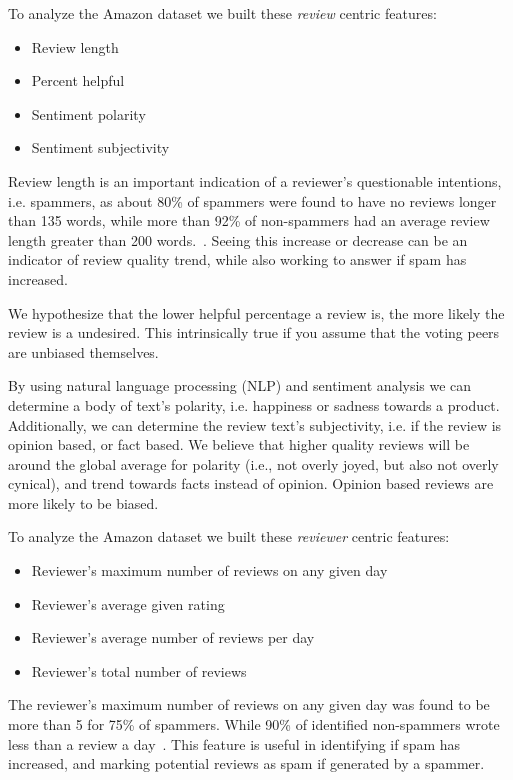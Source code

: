 \documentclass[journal, a4paper]{IEEEtran}
\begin{document}
To analyze the Amazon dataset we built these \textit{review} centric features:
\begin{itemize}
  \item Review length
  \item Percent helpful
  \item Sentiment polarity
  \item Sentiment subjectivity
\end{itemize}

Review length is an important indication of a reviewer's questionable intentions, i.e. spammers, as about 80\% of spammers were found to have no reviews longer than 135 words, while more than 92\% of non-spammers had an average review length greater than 200 words.~\cite{1}.
Seeing this increase or decrease can be an indicator of review quality trend, while also working to answer if spam has increased.

We hypothesize that the lower helpful percentage a review is, the more likely the review is a undesired. This intrinsically true if you assume that the voting peers are unbiased themselves.

By using natural language processing  (NLP) and sentiment analysis we can determine a body of text's polarity, i.e. happiness or sadness towards a product. Additionally, we can determine the review text's subjectivity, i.e. if the review is opinion based, or fact based. We believe that higher quality reviews will be around the global average for polarity (i.e., not overly joyed, but also not overly cynical), and trend towards facts instead of opinion. Opinion based reviews are more likely to be biased.

To analyze the Amazon dataset we built these \textit{reviewer} centric features:
\begin{itemize}
  \item Reviewer's maximum number of reviews on any given day
  \item Reviewer's average given rating
  \item Reviewer's average number of reviews per day
  \item Reviewer's total number of reviews
\end{itemize}

The reviewer's maximum number of reviews on any given day was found to be more than 5 for 75\% of spammers.
While 90\% of identified non-spammers wrote less than a review a day~\cite{1}. This feature is useful in identifying if spam has increased, and marking potential reviews as spam if generated by a spammer.
\end{document}
